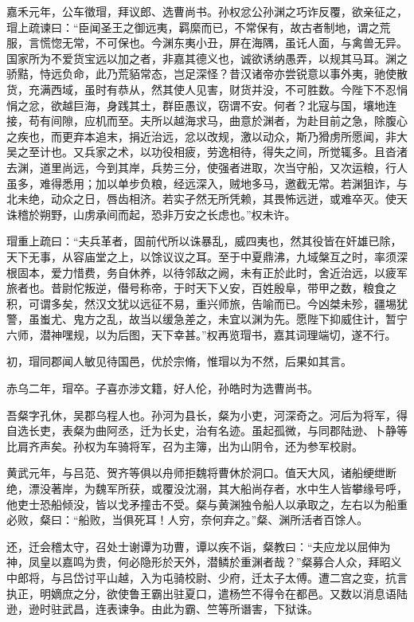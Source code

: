 \documentclass[12pt,UTF8]{ctexbook}
\begin{document}
嘉禾元年，公车徵瑁，拜议郎、选曹尚书。孙权忿公孙渊之巧诈反覆，欲亲征之，瑁上疏谏曰：“臣闻圣王之御远夷，羁縻而已，不常保有，故古者制地，谓之荒服，言慌惚无常，不可保也。今渊东夷小丑，屏在海隅，虽讬人面，与禽兽无异。国家所为不爱货宝远以加之者，非嘉其德义也，诚欲诱纳愚弄，以规其马耳。渊之骄黠，恃远负命，此乃荒貊常态，岂足深怪？昔汉诸帝亦尝锐意以事外夷，驰使散货，充满西域，虽时有恭从，然其使人见害，财货并没，不可胜数。今陛下不忍悁悁之忿，欲越巨海，身践其土，群臣愚议，窃谓不安。何者？北寇与国，壤地连接，苟有间隙，应机而至。夫所以越海求马，曲意於渊者，为赴目前之急，除腹心之疾也，而更弃本追末，捐近治远，忿以改规，激以动众，斯乃猾虏所愿闻，非大吴之至计也。又兵家之术，以功役相疲，劳逸相待，得失之间，所觉辄多。且沓渚去渊，道里尚远，今到其岸，兵势三分，使强者进取，次当守船，又次运粮，行人虽多，难得悉用；加以单步负粮，经远深入，贼地多马，邀截无常。若渊狙诈，与北未绝，动众之日，唇齿相济。若实孑然无所凭赖，其畏怖远迸，或难卒灭。使天诛稽於朔野，山虏承间而起，恐非万安之长虑也。”权未许。

瑁重上疏曰：“夫兵革者，固前代所以诛暴乱，威四夷也，然其役皆在奸雄已除，天下无事，从容庙堂之上，以馀议议之耳。至于中夏鼎沸，九域槃互之时，率须深根固本，爱力惜费，务自休养，以待邻敌之阙，未有正於此时，舍近治远，以疲军旅者也。昔尉佗叛逆，僣号称帝，于时天下乂安，百姓殷阜，带甲之数，粮食之积，可谓多矣，然汉文犹以远征不易，重兴师旅，告喻而已。今凶桀未殄，疆埸犹警，虽蚩尤、鬼方之乱，故当以缓急差之，未宜以渊为先。愿陛下抑威住计，暂宁六师，潜神嘿规，以为后图，天下幸甚。”权再览瑁书，嘉其词理端切，遂不行。

初，瑁同郡闻人敏见待国邑，优於宗脩，惟瑁以为不然，后果如其言。

赤乌二年，瑁卒。子喜亦涉文籍，好人伦，孙皓时为选曹尚书。

吾粲字孔休，吴郡乌程人也。孙河为县长，粲为小吏，河深奇之。河后为将军，得自选长吏，表粲为曲阿丞，迁为长史，治有名迹。虽起孤微，与同郡陆逊、卜静等比肩齐声矣。孙权为车骑将军，召为主簿，出为山阴令，还为参军校尉。

黄武元年，与吕范、贺齐等俱以舟师拒魏将曹休於洞口。值天大风，诸船绠绁断绝，漂没著岸，为魏军所获，或覆没沈溺，其大船尚存者，水中生人皆攀缘号呼，他吏士恐船倾没，皆以戈矛撞击不受。粲与黄渊独令船人以承取之，左右以为船重必败，粲曰：“船败，当俱死耳！人穷，奈何弃之。”粲、渊所活者百馀人。

还，迁会稽太守，召处士谢谭为功曹，谭以疾不诣，粲教曰：“夫应龙以屈伸为神，凤皇以嘉鸣为贵，何必隐形於天外，潜鳞於重渊者哉？”粲募合人众，拜昭义中郎将，与吕岱讨平山越，入为屯骑校尉、少府，迁太子太傅。遭二宫之变，抗言执正，明嫡庶之分，欲使鲁王霸出驻夏口，遣杨竺不得令在都邑。又数以消息语陆逊，逊时驻武昌，连表谏争。由此为霸、竺等所谮害，下狱诛。
\end{document}
